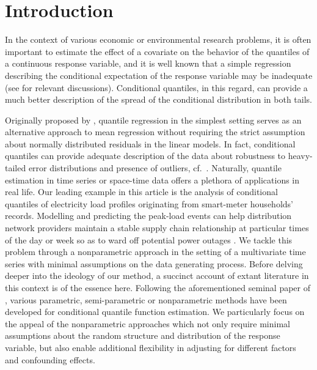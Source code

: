 \documentclass[aos]{imsart}
\theoremstyle{plain}
\theoremstyle{remark}
\begin{document}
\section{Introduction}\label{sec:introduction}

In the context of various economic or environmental research problems, it is often important to estimate the effect of a covariate on the behavior of the quantiles of a continuous response variable, and it is well known that a simple regression describing the conditional expectation of the response variable may be inadequate (see \cite{reich2012spatiotemporal} for relevant discussions). Conditional quantiles, in this regard, can provide a much better description of the spread of the conditional distribution in both tails. 

Originally proposed by \cite{koenker1978regression}, quantile regression in the simplest setting serves as an alternative approach to mean regression without requiring the strict assumption about normally distributed residuals in the linear models. In fact, conditional quantiles can provide adequate description of the data about robustness to heavy-tailed error distributions and presence of outliers, cf.\ \cite{chaudhuri1997average,ezzahrioui2008asymptotic}. Naturally, quantile estimation in time series or space-time data offers a plethora of applications in real life. Our leading example in this article is the analysis of conditional quantiles of electricity load profiles originating from smart-meter households' records. Modelling and predicting the peak-load events can help distribution network providers maintain a stable supply chain relationship at particular times of the day or week so as to ward off potential power outages \citep[][]{jacob2020forecasting}. We tackle this problem through a nonparametric approach in the setting of a multivariate time series with minimal assumptions on the data generating process. Before delving deeper into the ideology of our method, a succinct account of extant literature in this context is of the essence here. Following the aforementioned seminal paper of \cite{koenker1978regression}, various parametric, semi-parametric or nonparametric methods have been developed for conditional quantile function estimation. We particularly focus on the appeal of the nonparametric approaches which not only require minimal assumptions about the random structure and distribution of the response variable, but also enable additional flexibility in adjusting for different factors and confounding effects. 
\end{document}
